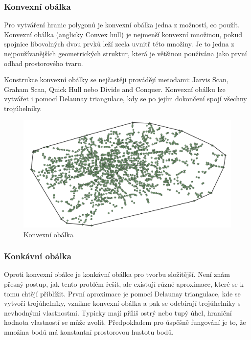 \subsubsection{Konvexní obálka}
\label{konv_obalka}

Pro vytváření hranic polygonů je konvexní obálka jedna z možností, co použít. Konvexní obálka (anglicky Convex hull)
je nejmenší konvexní množinou, pokud spoj\-nice  libovolných dvou prvků leží zcela uvnitř této množiny.
Je to jedna z nejpoužívanějších geometrických struktur, která je většinou používána jako první odhad
prostorového tvaru.

Konstrukce konvexní obálky se nejčastěji provádějí metodami: Jarvis Scan, Graham Scan, Quick Hull nebo
Divide and Conquer. Konvexní obálku lze vytvářet i pomocí Delaunay triangulace, kdy se po jejím dokončení
spojí všechny trojúhelníky.

\begin{figure}[H] \centering
    \includegraphics[width=400pt]{./pictures/convexHull.png}
    \caption[Konvexní obálka]{Konvexní obálka}
	\label{fig:convexHull}              
\end{figure}

\subsubsection{Konkávní obálka}
\label{konk_obalka}
 
Oproti konvexní obálce je konkávní obálka pro tvorbu složitější. Není znám přesný postup,
jak tento problém řešit, ale existují různé aproximace, které se k tomu chtějí přiblížit.
První aproximace je pomocí Delaunay triangulace, kde se vytvoří trojúhelníky, vznikne
konvexní obálka a pak se odebírají trojúhelníky s nevhodnými vlastnostmi. Typicky mají příliš ostrý nebo tupý
úhel, hraniční hodnota vlastností se může zvolit.
Předpokladem pro úspěšně fungování je to, že množina bodů má konstantní
prostorovou hustotu bodů.

